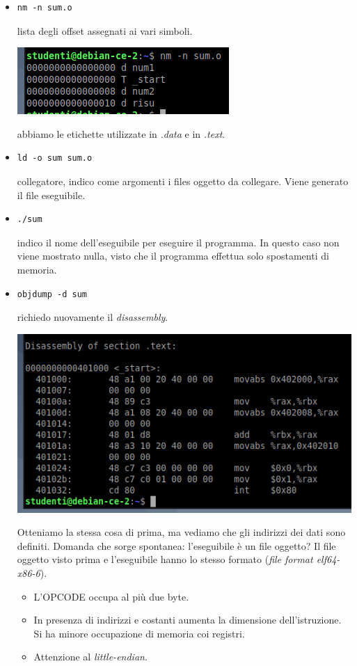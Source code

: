 \documentclass[11pt]{report}
\theoremstyle{definition}
\begin{document}
\begin{itemize}
\begin{itemize}
\begin{itemize}
	\end{itemize}

\end{itemize}

\item \begin{verbatim}nm -n sum.o\end{verbatim}
lista degli offset assegnati ai vari simboli.\begin{center}
	\includegraphics{img/141.PNG}
\end{center}
abbiamo le etichette utilizzate in \emph{.data} e in \emph{.text}.
\item \begin{verbatim}ld -o sum sum.o\end{verbatim}
collegatore, indico come argomenti i files oggetto da collegare. Viene generato il file eseguibile.
\item \begin{verbatim}./sum\end{verbatim}
indico il nome dell'eseguibile per eseguire il programma. In questo caso non viene mostrato nulla, visto che il programma effettua solo spostamenti di memoria.
\item \begin{verbatim}objdump -d sum\end{verbatim}
richiedo nuovamente il \emph{disassembly}. \begin{center}
	\includegraphics{img/142.PNG}
\end{center}Otteniamo la stessa cosa di prima, ma vediamo che gli indirizzi dei dati sono definiti. Domanda che sorge spontanea: l'eseguibile è un file oggetto? Il file oggetto visto prima e l'eseguibile hanno lo stesso formato (\emph{file format elf64-x86-6}). 
\begin{itemize}
	\item L'OPCODE occupa al più due byte.
	\item In presenza di indirizzi e costanti aumenta la dimensione dell'istruzione. Si ha minore occupazione di memoria coi registri.
	\item Attenzione al \emph{little-endian}.
\end{itemize}
\end{itemize}
\end{document}
